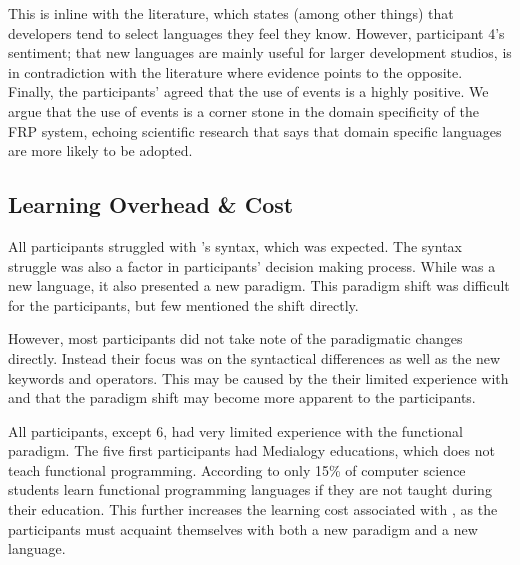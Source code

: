 This is inline with the literature, which states (among other things) that developers tend to select languages they feel they know\cite{meyerovich2013empirical}. However, participant 4's sentiment; that new languages are mainly useful for larger development studios, is in contradiction with the literature where evidence points to the opposite. Finally, the participants' agreed that the use of events is a highly positive. We argue that the use of events is a corner stone in the domain specificity of the \gls{FRP} system, echoing scientific research that says that domain specific languages are more likely to be adopted\cite{meyerovich2013empirical}.

\subsection{Learning Overhead \& Cost}
All participants struggled with \fs's syntax, which was expected. The syntax struggle was also a factor in participants' decision making process. While \fs was a new language, it also presented a new paradigm. This paradigm shift was difficult for the participants, but few mentioned the shift directly.


However, most participants did not take note of the paradigmatic changes directly. Instead their focus was on the syntactical differences as well as the new keywords and operators. This may be caused by the their limited experience with \fs and that the paradigm shift may become more apparent to the participants.



All participants, except 6, had very limited experience with the functional paradigm. The five first participants had Medialogy educations, which does not teach functional programming. According to \cite{meyerovich2013empirical} only 15\% of computer science students learn functional programming languages if they are not taught during their education. This further increases the learning cost associated with \fs, as the participants must acquaint themselves with both a new paradigm and a new language.

